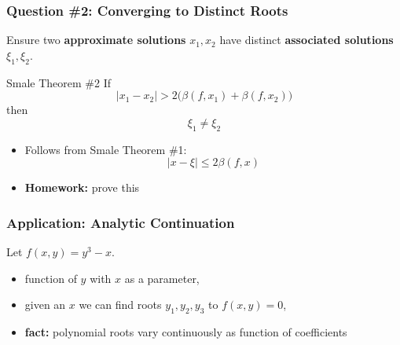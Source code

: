 \documentclass{beamer}
\begin{document}
\begin{frame}
  \frametitle{Question \#2: Converging to Distinct Roots}

  Ensure two {\bf approximate solutions} $x_1, x_2$ have distinct {\bf
    associated solutions} $\xi_1, \xi_2$.

  \pause

  \begin{block}{Smale Theorem \#2}
    If
    \[
    | x_1 - x_2 | > 2 \bigg( \beta(f,x_1) + \beta(f,x_2) \bigg)
    \]
    then
    \[
    \xi_1 \neq \xi_2
    \]
  \end{block}

  \pause

  \begin{itemize}
  \item<3-> Follows from Smale Theorem \#1:
    \[
    | x - \xi | \leq 2 \beta(f,x)
    \]
  \item<4-> {\bf Homework:} prove this
  \end{itemize}

\end{frame}



\begin{frame}
  \frametitle{Application: Analytic Continuation}

  Let $f(x,y) = y^3 - x$.
  \begin{itemize}
  \item<2-> function of $y$ with $x$ as a parameter,
  \item<3-> given an $x$ we can find roots $y_{1},y_{2},y_{3}$ to
    $f(x,y) = 0$,
  \item<4-> {\bf fact:} polynomial roots vary continuously as function of
    coefficients
  \end{itemize}


\end{frame}
\end{document}
